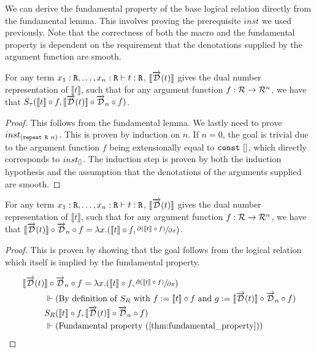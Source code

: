   We can derive the fundamental property of the base logical relation directly from the fundamental lemma.
  This involves proving the prerequisite $inst$ we used previously.
  Note that the correctness of both the macro and the fundamental property is dependent on the requirement that the denotations supplied by the argument function are smooth.

  \begin{corollary}\label{thm:fundamental_property}
    For any term $x_1 : \texttt{R}, \dots, x_n : \texttt{R} \vdash t : \texttt{R}$, $\llbracket\overrightarrow{\mathcal{D}}(t)\rrbracket$ gives the dual number representation of $\llbracket t \rrbracket$, such that for any argument function $f : \mathcal{R} \to \mathcal{R}^n$, we have that $S_\tau(\llbracket t\rrbracket \circ f, \llbracket \overrightarrow{\mathcal{D}}(t)\rrbracket \circ \overrightarrow{\mathcal{D}}_n \circ f)$.
  \end{corollary}

  \begin{proof}
    This follows from the fundamental lemma. We lastly need to prove $inst_{(\texttt{repeat}\ \texttt{R}\ n)}$.
    This is proven by induction on $n$.
    If $n = 0$, the goal is trivial due to the argument function $f$ being extensionally equal to $\texttt{const}\ []$, which directly corresponds to $inst_{[]}$.
    The induction step is proven by both the induction hypothesis and the assumption that the denotations of the arguments supplied are smooth.
  \end{proof}

  \begin{theorem}\label{thm:macro_correctness}
    For any term $x_1 : \texttt{R}, \dots, x_n : \texttt{R} \vdash t : \texttt{R}$, $\llbracket\overrightarrow{\mathcal{D}}(t)\rrbracket$ gives the dual number representation of $\llbracket t \rrbracket$, such that for any argument function $f : \mathcal{R} \rightarrow \mathcal{R}^n$, we have that $\llbracket \overrightarrow{\mathcal{D}}(t) \rrbracket \circ \overrightarrow{\mathcal{D}}_n \circ f = \lambda x. (\llbracket t \rrbracket \circ f, \sfrac{\partial{(\llbracket t \rrbracket \circ f)}}{\partial{x}})$.
  \end{theorem}

  \begin{proof}
    This is proven by showing that the goal follows from the logical relation which itself is implied by the fundamental property.

    \begin{align*}
      \llbracket \overrightarrow{\mathcal{D}}(t) &\rrbracket \circ \overrightarrow{\mathcal{D}}_n \circ f = \lambda x. (\llbracket t \rrbracket \circ f, \sfrac{\partial{(\llbracket t \rrbracket \circ f)}}{\partial{x}}) \\
      & \Vdash \text{(By definition of $S_R$ with $f := \llbracket t \rrbracket \circ f$ and $g := \llbracket \overrightarrow{\mathcal{D}}(t) \rrbracket \circ \overrightarrow{\mathcal{D}}_n \circ f$)} \\
      & S_R(\llbracket t \rrbracket \circ f, \llbracket \overrightarrow{\mathcal{D}}(t) \rrbracket \circ \overrightarrow{\mathcal{D}}_n \circ f) \\
      & \Vdash \text{(Fundamental property (\ref{thm:fundamental_property}))}
    \end{align*}
  \end{proof}
